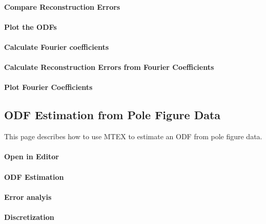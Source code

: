 \documentclass{article}
\begin{document}
			\paragraph{Compare Reconstruction Errors}
		
			\paragraph{Plot the ODFs}
		
			\paragraph{Calculate Fourier coefficients}
		
			\paragraph{Calculate Reconstruction Errors from Fourier Coefficients}
		
			\paragraph{Plot Fourier Coefficients}
		
		\subsection{ODF Estimation from Pole Figure Data}

		
                     \begin{par}
This page describes how to use MTEX to estimate an ODF from pole figure data.
\end{par} \vspace{1em}

                  
			\paragraph{Open in Editor}
		
			\paragraph{ODF Estimation}
		
			\paragraph{Error analyis}
		
			\paragraph{Discretization}
		
\end{document}
